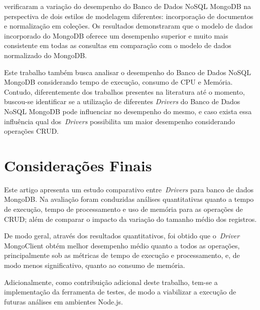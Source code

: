 \documentclass[12pt]{article}
\begin{document}
\cite{kanade2014study} verificaram a variação do desempenho do Banco de Dados NoSQL MongoDB na perspectiva de dois estilos de modelagem diferentes: incorporação de documentos e normalização em coleções. Os resultados demonstraram que o modelo de dados incorporado do MongoDB oferece um desempenho superior e muito mais consistente em todas as consultas em comparação com o modelo de dados normalizado do MongoDB.

Este trabalho também busca analisar o desempenho do Banco de Dados NoSQL MongoDB considerando tempo de execução, consumo de CPU e Memória. Contudo, diferentemente dos trabalhos presentes na literatura até o momento, buscou-se identificar se a utilização de diferentes \emph{Drivers} do Banco de Dados NoSQL MongoDB pode influenciar no desempenho do mesmo, e caso exista essa influência qual dos~\emph{Drivers} possibilita um maior desempenho considerando operações CRUD.

\section{Considerações Finais}
\label{section:consideracoes}

Este artigo apresenta um estudo comparativo entre~\emph{Drivers} para banco de dados MongoDB.
Na avaliação foram conduzidas análises quantitativas quanto a tempo de execução, tempo de processamento e uso de memória para as operações de CRUD; além de comparar o impacto da variação do tamanho médio dos registros.

De modo geral, através dos resultados quantitativos, foi obtido que o~\emph{Driver} MongoClient obtém melhor desempenho médio quanto a todos as operações, principalmente sob as métricas de tempo de execução e processamento, e, de modo menos significativo, quanto ao consumo de memória.

Adicionalmente, como contribuição adicional deste trabalho, tem-se a implementação da ferramenta de testes, de modo a viabilizar a execução de futuras análises em ambientes Node.js.




\end{document}
